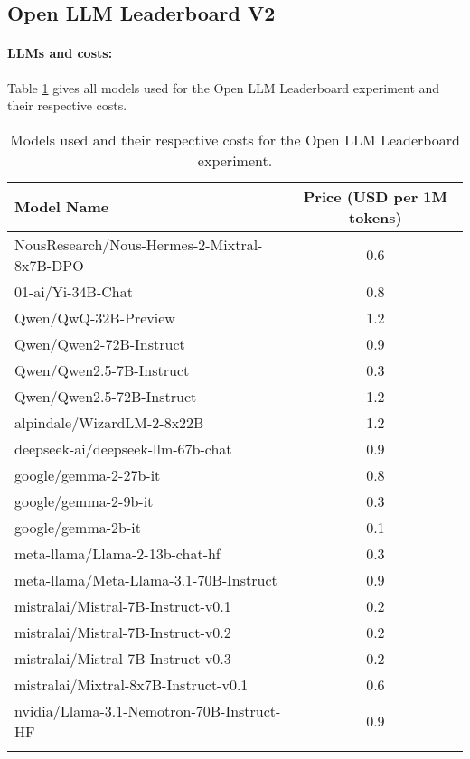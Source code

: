 \subsection{Open LLM Leaderboard V2}\label{append:llms_open}


\paragraph{LLMs and costs:} Table \ref{tab:llms_open} gives all models used for the Open LLM Leaderboard experiment and their respective costs.
\begin{longtable}{lc}
\caption{Models used and their respective costs for the Open LLM Leaderboard experiment.}

\\ \hline
\textbf{Model Name} & \textbf{Price (USD per 1M tokens)} \\ \hline
NousResearch/Nous-Hermes-2-Mixtral-8x7B-DPO & 0.6 \\ \hline
01-ai/Yi-34B-Chat & 0.8 \\ \hline
Qwen/QwQ-32B-Preview & 1.2 \\ \hline
Qwen/Qwen2-72B-Instruct & 0.9 \\ \hline
Qwen/Qwen2.5-7B-Instruct & 0.3 \\ \hline
Qwen/Qwen2.5-72B-Instruct & 1.2 \\ \hline
alpindale/WizardLM-2-8x22B & 1.2 \\ \hline
deepseek-ai/deepseek-llm-67b-chat & 0.9 \\ \hline
google/gemma-2-27b-it & 0.8 \\ \hline
google/gemma-2-9b-it & 0.3 \\ \hline
google/gemma-2b-it & 0.1 \\ \hline
meta-llama/Llama-2-13b-chat-hf & 0.3 \\ \hline
meta-llama/Meta-Llama-3.1-70B-Instruct & 0.9 \\ \hline
mistralai/Mistral-7B-Instruct-v0.1 & 0.2 \\ \hline
mistralai/Mistral-7B-Instruct-v0.2 & 0.2 \\ \hline
mistralai/Mistral-7B-Instruct-v0.3 & 0.2 \\ \hline
mistralai/Mixtral-8x7B-Instruct-v0.1 & 0.6 \\ \hline
nvidia/Llama-3.1-Nemotron-70B-Instruct-HF & 0.9 \\ \hline
\label{tab:llms_open}
\end{longtable}

